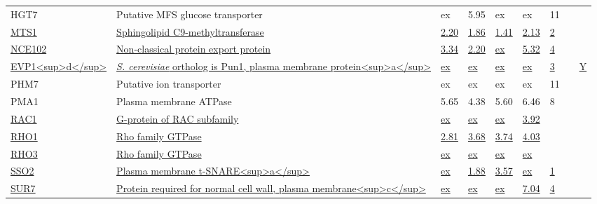 \begin{ThreePartTable}
\begin{longtable}[t]{lllllllll}
\hspace{1em}HGT7 & Putative MFS glucose transporter & ex & 5.95 & ex & ex & 11 &  & \\
\hspace{1em}\underline{MTS1} & \underline{Sphingolipid C9-methyltransferase} & \underline{2.20} & \underline{1.86} & \underline{1.41} & \underline{2.13} & \underline{2} & \underline{} & \underline{}\\
\hspace{1em}\underline{NCE102} & \underline{Non-classical protein export protein} & \underline{3.34} & \underline{2.20} & \underline{ex} & \underline{5.32} & \underline{4} & \underline{} & \underline{}\\
\hspace{1em}\underline{EVP1<sup>d</sup>} & \underline{\textit{S. cerevisiae} ortholog is Pun1, plasma membrane protein<sup>a</sup>} & \underline{ex} & \underline{ex} & \underline{ex} & \underline{ex} & \underline{3} & \underline{} & \underline{Y}\\
\hspace{1em}PHM7 & Putative ion transporter & ex & ex & ex & ex & 11 &  & \\
\hspace{1em}PMA1 & Plasma membrane ATPase & 5.65 & 4.38 & 5.60 & 6.46 & 8 &  & \\
\hspace{1em}\underline{RAC1} & \underline{G-protein of RAC subfamily} & \underline{ex} & \underline{ex} & \underline{ex} & \underline{3.92} & \underline{} & \underline{} & \underline{}\\
\hspace{1em}\underline{RHO1} & \underline{Rho family GTPase} & \underline{2.81} & \underline{3.68} & \underline{3.74} & \underline{4.03} & \underline{} & \underline{} & \underline{}\\
\hspace{1em}\underline{RHO3} & \underline{Rho family GTPase} & \underline{ex} & \underline{ex} & \underline{ex} & \underline{ex} & \underline{} & \underline{} & \underline{}\\
\hspace{1em}\underline{SSO2} & \underline{Plasma membrane t-SNARE<sup>a</sup>} & \underline{ex} & \underline{1.88} & \underline{3.57} & \underline{ex} & \underline{1} & \underline{} & \underline{}\\
\hspace{1em}\underline{SUR7} & \underline{Protein required for normal cell wall, plasma membrane<sup>c</sup>} & \underline{ex} & \underline{ex} & \underline{ex} & \underline{7.04} & \underline{4} & \underline{} & \underline{}\\

\end{longtable}
\end{ThreePartTable}
